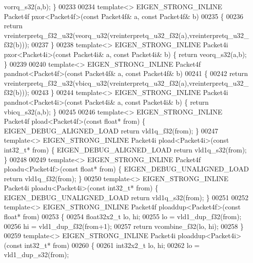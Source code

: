 \begin{DoxyCode}
{{      vorrq\_s32(a,b); \}
00233 
00234 \textcolor{keyword}{template}<> EIGEN\_STRONG\_INLINE Packet4f pxor<Packet4f>(\textcolor{keyword}{const} Packet4f& a, \textcolor{keyword}{const} Packet4f& b)
00235 \{
00236   \textcolor{keywordflow}{return} vreinterpretq\_f32\_u32(veorq\_u32(vreinterpretq\_u32\_f32(a),vreinterpretq\_u32\_f32(b)));
00237 \}
00238 \textcolor{keyword}{template}<> EIGEN\_STRONG\_INLINE Packet4i pxor<Packet4i>(\textcolor{keyword}{const} Packet4i& a, \textcolor{keyword}{const} Packet4i& b) \{ \textcolor{keywordflow}{return} 
      veorq\_s32(a,b); \}
00239 
00240 \textcolor{keyword}{template}<> EIGEN\_STRONG\_INLINE Packet4f pandnot<Packet4f>(\textcolor{keyword}{const} Packet4f& a, \textcolor{keyword}{const} Packet4f& b)
00241 \{
00242   \textcolor{keywordflow}{return} vreinterpretq\_f32\_u32(vbicq\_u32(vreinterpretq\_u32\_f32(a),vreinterpretq\_u32\_f32(b)));
00243 \}
00244 \textcolor{keyword}{template}<> EIGEN\_STRONG\_INLINE Packet4i pandnot<Packet4i>(\textcolor{keyword}{const} Packet4i& a, \textcolor{keyword}{const} Packet4i& b) \{ \textcolor{keywordflow}{return} 
      vbicq\_s32(a,b); \}
00245 
00246 \textcolor{keyword}{template}<> EIGEN\_STRONG\_INLINE Packet4f pload<Packet4f>(\textcolor{keyword}{const} \textcolor{keywordtype}{float}*    from) \{ EIGEN\_DEBUG\_ALIGNED\_LOAD \textcolor{keywordflow}{
      return} vld1q\_f32(from); \}
00247 \textcolor{keyword}{template}<> EIGEN\_STRONG\_INLINE Packet4i pload<Packet4i>(\textcolor{keyword}{const} int32\_t*  from) \{ EIGEN\_DEBUG\_ALIGNED\_LOAD \textcolor{keywordflow}{
      return} vld1q\_s32(from); \}
00248 
00249 \textcolor{keyword}{template}<> EIGEN\_STRONG\_INLINE Packet4f ploadu<Packet4f>(\textcolor{keyword}{const} \textcolor{keywordtype}{float}*   from) \{ EIGEN\_DEBUG\_UNALIGNED\_LOAD \textcolor{keywordflow}{
      return} vld1q\_f32(from); \}
00250 \textcolor{keyword}{template}<> EIGEN\_STRONG\_INLINE Packet4i ploadu<Packet4i>(\textcolor{keyword}{const} int32\_t* from) \{ EIGEN\_DEBUG\_UNALIGNED\_LOAD \textcolor{keywordflow}{
      return} vld1q\_s32(from); \}
00251 
00252 \textcolor{keyword}{template}<> EIGEN\_STRONG\_INLINE Packet4f ploaddup<Packet4f>(\textcolor{keyword}{const} \textcolor{keywordtype}{float}* from)
00253 \{
00254   float32x2\_t lo, hi;
00255   lo = vld1\_dup\_f32(from);
00256   hi = vld1\_dup\_f32(from+1);
00257   \textcolor{keywordflow}{return} vcombine\_f32(lo, hi);
00258 \}
00259 \textcolor{keyword}{template}<> EIGEN\_STRONG\_INLINE Packet4i ploaddup<Packet4i>(\textcolor{keyword}{const} int32\_t* from)
00260 \{
00261   int32x2\_t lo, hi;
00262   lo = vld1\_dup\_s32(from);
}}
\end{DoxyCode}
